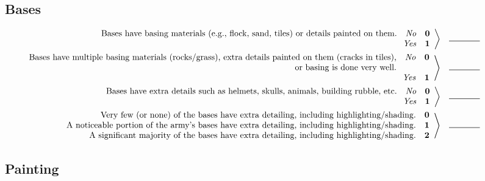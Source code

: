\documentclass[10pt,notitlepage]{report}
\newcommand{\scoredescr}[1]{\makebox[6in][r]{#1}}
\newcommand{\score}[1]{\quad\textbf{#1}}
\newcommand{\yes}{\quad\textit{Yes}}
\newcommand{\no}{\quad\textit{No}}
\newcommand{\entry}{\quad\rule{.5in}{.5pt}}
\begin{document}
\subsection*{Bases}
\begin{align*}
\left.
\begin{array}{r}
\scoredescr{Bases have basing materials (e.g., flock, sand, tiles) or details painted on them.\no\score{0}} \\
\scoredescr{\yes\score{1}}
\end{array}
\right\rangle
 & \entry \\
\left.
\begin{array}{r}
\scoredescr{Bases have multiple basing materials (rocks/grass), extra details painted on them (cracks in tiles),\no\score{0}} \\
\scoredescr{or basing is done very well.\phantom{\no\score{0}}} \\
\scoredescr{\yes\score{1}}
\end{array}
\right\rangle
 & \entry \\
\left.
\begin{array}{r}
\scoredescr{Bases have extra details such as helmets, skulls, animals, building rubble, etc.\no\score{0}} \\
\scoredescr{\yes\score{1}}
\end{array}
\right\rangle
 & \entry \\
\left.
\begin{array}{r}
\scoredescr{Very few (or none) of the bases have extra detailing, including highlighting/shading.\score{0}} \\
\scoredescr{A noticeable portion of the army's bases have extra detailing, including highlighting/shading.\score{1}} \\
\scoredescr{A significant majority of the bases have extra detailing, including highlighting/shading.\score{2}}
\end{array}
\right\rangle
 & \entry
\end{align*}

\subsection*{Painting}
\end{document}
